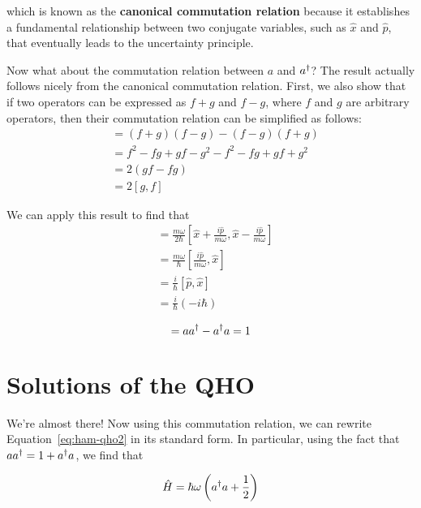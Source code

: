 which is known as the \textbf{canonical commutation relation} because it establishes a fundamental relationship between two conjugate variables, such as $\hat{x}$ and $\hat{p}$, that eventually leads to the uncertainty principle. \par 

Now what about the commutation relation between $a$ and $a^{\dagger}$? The result actually follows nicely from the canonical commutation relation. First, we also show that if two operators can be expressed as $f+g$ and $f-g$, where $f$ and $g$ are arbitrary operators, then their commutation relation can be simplified as follows:
\begin{align*}
	[f+g,f-g] &= (f+g)(f-g) - (f-g)(f+g) \\
	&= f^2 - fg + gf -g^2 - f^2 - fg + gf + g^2 \\
	&= 2(gf - fg) \\
	&= 2[g,f]
\end{align*}

We can apply this result to find that
\begin{align*}
	[a, \ad] &= \frac{m\omega}{2\hbar}\left[\hat{x} + \frac{i\hat{p}}{m\omega}, \hat{x} - \frac{i\hat{p}}{m\omega} \right] \\
	&= \frac{m\omega}{\hbar} \left[ \frac{i\hat{p}}{m\omega}, \hat{x} \right] \\
	&= \frac{i}{\hbar}[\hat{p},\hat{x}] \\
	&= \frac{i}{\hbar}(-i\hbar) 
\end{align*}

\begin{tcolorbox}[title = Ladder operators commutation relation] \vspace{-2ex}
	\begin{equation}
		[a,\ad] = a\ad - \ad a = 1  \label{eq:a-comm}
	\end{equation}
\end{tcolorbox}


\section{Solutions of the QHO}
We're almost there! Now using this commutation relation, we can rewrite Equation~\ref{eq:ham-qho2} in its standard form. In particular, using the fact that $aa^{\dagger} = 1 + a^{\dagger} a$, we find that
\begin{tcolorbox}[title = Hamiltonian of the QHO (with ladder operators)] \vspace{-2ex}
	\begin{equation}
	\hat{H} = \hbar\omega \left(a^{\dagger} a + \frac{1}{2} \right) \label{eq:ham-qho3}
	\end{equation}
\end{tcolorbox}

